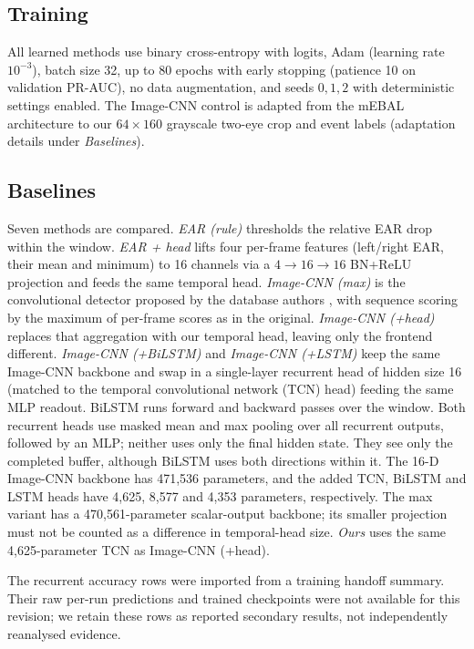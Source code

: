 \documentclass{IEEEmce}
\begin{document}
\subsection{Training}
All learned methods use binary cross-entropy with logits, Adam (learning rate
$10^{-3}$), batch size 32, up to 80 epochs with early stopping (patience 10 on
validation PR-AUC), no data augmentation, and seeds $0,1,2$ with deterministic settings
enabled. The Image-CNN control is adapted from the mEBAL architecture \cite{daza2020} to
our $64\times160$ grayscale two-eye crop and event labels (adaptation details under
\emph{Baselines}).

\subsection{Baselines}
\label{sec_baselines}
Seven methods are compared. \emph{EAR (rule)} thresholds the relative EAR drop within
the window. \emph{EAR + head} lifts four per-frame features (left/right EAR, their mean
and minimum) to 16 channels via a $4\to16\to16$ BN+ReLU projection and feeds the same
temporal head. \emph{Image-CNN (max)} is the convolutional detector proposed by the
database authors \cite{daza2020}, with sequence scoring by the maximum of per-frame
scores as in the original. \emph{Image-CNN (+head)} replaces that aggregation with our
temporal head, leaving only the frontend different. \emph{Image-CNN (+BiLSTM)} and
\emph{Image-CNN (+LSTM)} keep the same Image-CNN backbone and swap in a single-layer
recurrent head of hidden size 16 (matched to the temporal convolutional network (TCN)
head) feeding the same MLP readout. BiLSTM runs forward and backward passes over the
window. Both recurrent heads use masked mean and max pooling over all recurrent outputs,
followed by an MLP; neither uses only the final hidden state. They see only the completed
buffer, although BiLSTM uses both directions within it. The 16-D Image-CNN backbone has
471,536 parameters, and the added TCN, BiLSTM and LSTM heads have 4,625, 8,577 and 4,353
parameters, respectively. The max variant has a 470,561-parameter scalar-output backbone;
its smaller projection must not be counted as a difference in temporal-head size.
\emph{Ours} uses the same 4,625-parameter TCN as Image-CNN (+head).

The recurrent accuracy rows were imported from a training handoff summary. Their raw
per-run predictions and trained checkpoints were not available for this revision;
we retain these rows as reported secondary results, not independently reanalysed evidence.
\end{document}

